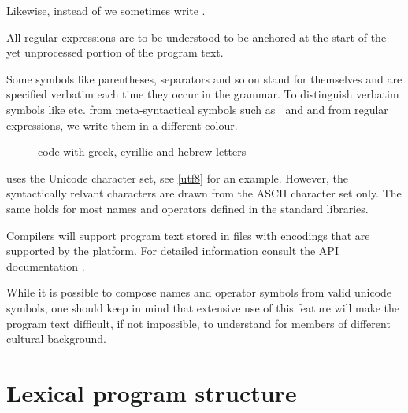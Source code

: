 Likewise, instead of  we sometimes write \oder{}.

All regular expressions are to be understood to be anchored at the start of the yet unprocessed portion of the program text.

\par Some symbols like parentheses, separators and so on stand for themselves and are specified verbatim each time they occur in the grammar. To distinguish verbatim symbols like \sym{<- , ; ::} etc. from meta-syntactical symbols such as {\Large $|$} and  and from regular expressions, we write them in a different colour.

\begin{figure}[bth]
\epsfxsize\hsize {}
\caption{\frege{} code with greek, cyrillic and hebrew letters}
\label{utf8}
\end{figure}

\par \frege{} uses the Unicode character set, see \autoref{utf8} for an
example. However, the syntactically relvant characters are drawn from
the ASCII character set only. The same holds for most names and operators defined in
the standard libraries. 

Compilers will support program text stored in files with encodings
that are supported by the \java{} platform.
For detailed information consult the \java{}
API documentation \cite{apidoc}. 

While it is possible to compose names and operator symbols from
valid unicode symbols, one should keep in mind that extensive use of
this feature will make the program text
difficult, if not impossible, to understand for members of different
cultural background.

\section{Lexical program structure}

\begin{flushleft}
 \\
  \\
 \\
  \oder {} \oder {} \oder {} \oder {} \oder {}
\\\hspace{0.5in} \oder {} \oder {}
\end{flushleft}

